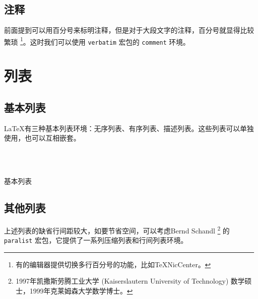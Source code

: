 \subsection{注释}
前面提到可以用百分号来标明注释，但是对于大段文字的注释，百分号就显得比较繁琐 \footnote{有的编辑器提供切换多行百分号的功能，比如TeXNicCenter。}。这时我们可以使用 \texttt{verbatim} 宏包的 \texttt{comment} 环境。

\begin{Code}[]
\begin{comment}
...
\end{comment}
\end{Code}

\section{列表}\label{sec:list}

\subsection{基本列表}

\LaTeX 有三种基本列表环境：无序列表、有序列表、描述列表。这些列表可以单独使用，也可以互相嵌套。

\begin{example}[h]
\\
\\
\caption{基本列表}
\end{example}

\subsection{其他列表}

上述列表的缺省行间距较大，如要节省空间，可以考虑Bernd Schandl\indexSchandl{} \footnote{1997年凯撒斯劳腾工业大学 (Kaiserslautern University of Technology) 数学硕士，1999年克莱姆森大学数学博士。} 的 \texttt{paralist} 宏包，它提供了一系列压缩列表和行间列表环境。

